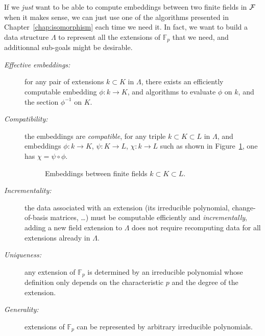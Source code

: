 If we \emph{just} want to be able to compute embeddings between two finite
fields in $\mathcal{F}$ when it makes sense, we can just use one of the algorithms presented
in Chapter~\ref{chap:isomorphism} each time we need it. In fact, we want to
build a data structure $\Lambda$ to represent all the extensions of
$\mathbb{F}_p$ that we need, and additionnal sub-goals might be desirable.
\begin{description}
\item[\emph{Effective embeddings:}] for any pair of extensions
  $k\subset K$ in $\Lambda$, there exists an efficiently computable
  embedding $\phi:k\to K$, and algorithms to evaluate $\phi$ on $k$,
  and the section $\phi^{-1}$ on $K$.
\item[\emph{Compatibility:}] the embeddings are \emph{compatible},
  \ie for any triple $k\subset K\subset L$ in $\Lambda$, and
  embeddings $\phi:k\to K$, $\psi:K\to L$, $\chi:k\to L$ such as shown in
  Figure~\ref{fig:compatibility}, one has
  $\chi=\psi\circ\phi$.
  \begin{figure}[h]
    \centering

  \caption{Embeddings between finite fields $k\subset K\subset L$.}
  \label{fig:compatibility}
  \end{figure}
\item[\emph{Incrementality:}] the data associated with an extension
  (\eg its irreducible polynomial, change-of-basis matrices, \dots)
  must be computable efficiently and \emph{incrementally}, \ie 
  adding a new field extension to $\Lambda$ does not require
  recomputing data for all extensions already in $\Lambda$.
\item[\emph{Uniqueness:}] any extension of $\mathbb{F}_{p}$ is determined by an
  irreducible polynomial whose definition only depends on the
  characteristic $p$ and the degree of the extension.
\item[\emph{Generality:}] extensions of $\mathbb{F}_{p}$ can be represented by
  arbitrary irreducible polynomials.
\end{description}

